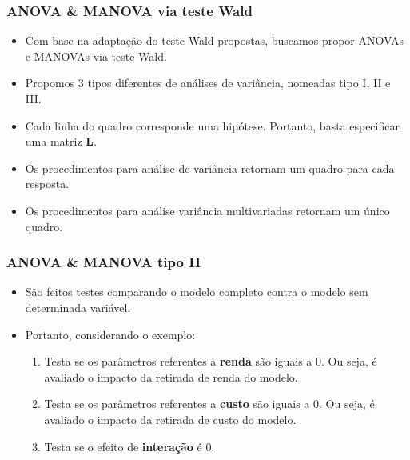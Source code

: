 \documentclass[10pt,
  aspectratio=169,
  serif,
  mathserif,
  professionalfont,
  compress,
  handout,
  ]{beamer}\usepackage[]{graphicx}\usepackage[]{color}
\begin{document}

\begin{frame}

\frametitle{ANOVA \& MANOVA via teste Wald}

\begin{itemize}
    \itemsep 2ex

  \item Com base na adaptação do teste Wald propostas, buscamos propor ANOVAs e MANOVAs via teste Wald.

  \item Propomos 3 tipos diferentes de análises de variância, nomeadas tipo I, II e III.

  \item Cada linha do quadro corresponde uma hipótese. Portanto, basta especificar uma matriz $\boldsymbol{L}$.

  \item Os procedimentos para análise de variância retornam um quadro para cada resposta.

  \item Os procedimentos para análise variância multivariadas retornam um único quadro. 
\end{itemize}

\end{frame}


\begin{frame}

\frametitle{ANOVA \& MANOVA tipo II}

\begin{itemize}
  \item São feitos testes comparando o modelo completo contra o modelo sem determinada variável. 
  
  \item Portanto, considerando o exemplo:

\begin{enumerate}
 \itemsep 2ex
  
  \item Testa se os parâmetros referentes a \textbf{renda} são iguais a 0. Ou seja, é avaliado o impacto da retirada de renda do modelo.
  
  \item Testa se os parâmetros referentes a \textbf{custo} são iguais a 0. Ou seja, é avaliado o impacto da retirada de custo do modelo.
  
  \item Testa se o efeito de \textbf{interação} é 0.

\end{enumerate}
\end{itemize}

\end{frame}
\end{document}
